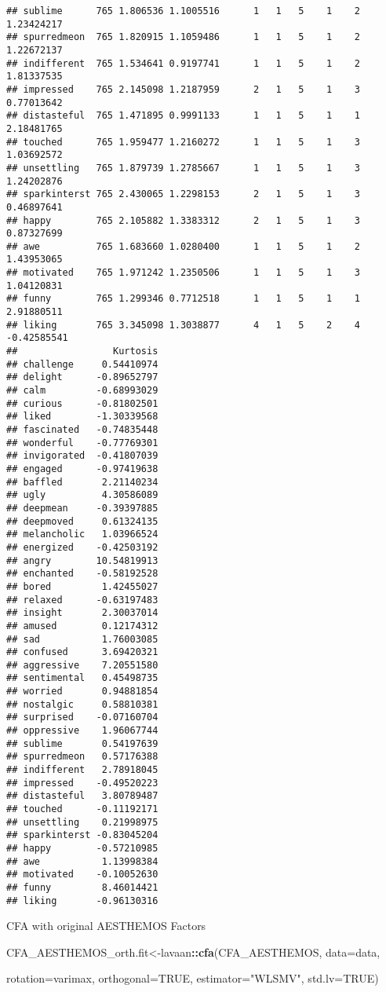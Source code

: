 \documentclass[
]{article}
\newenvironment{Shaded}{\begin{snugshade}}{\end{snugshade}}
\newcommand{\DataTypeTok}[1]{\textcolor[rgb]{0.13,0.29,0.53}{#1}}
\newcommand{\KeywordTok}[1]{\textcolor[rgb]{0.13,0.29,0.53}{\textbf{#1}}}
\newcommand{\NormalTok}[1]{#1}
\newcommand{\OperatorTok}[1]{\textcolor[rgb]{0.81,0.36,0.00}{\textbf{#1}}}
\newcommand{\OtherTok}[1]{\textcolor[rgb]{0.56,0.35,0.01}{#1}}
\newcommand{\StringTok}[1]{\textcolor[rgb]{0.31,0.60,0.02}{#1}}
\begin{document}
\begin{verbatim}
## sublime      765 1.806536 1.1005516      1   1   5    1    2  1.23424217
## spurredmeon  765 1.820915 1.1059486      1   1   5    1    2  1.22672137
## indifferent  765 1.534641 0.9197741      1   1   5    1    2  1.81337535
## impressed    765 2.145098 1.2187959      2   1   5    1    3  0.77013642
## distasteful  765 1.471895 0.9991133      1   1   5    1    1  2.18481765
## touched      765 1.959477 1.2160272      1   1   5    1    3  1.03692572
## unsettling   765 1.879739 1.2785667      1   1   5    1    3  1.24202876
## sparkinterst 765 2.430065 1.2298153      2   1   5    1    3  0.46897641
## happy        765 2.105882 1.3383312      2   1   5    1    3  0.87327699
## awe          765 1.683660 1.0280400      1   1   5    1    2  1.43953065
## motivated    765 1.971242 1.2350506      1   1   5    1    3  1.04120831
## funny        765 1.299346 0.7712518      1   1   5    1    1  2.91880511
## liking       765 3.345098 1.3038877      4   1   5    2    4 -0.42585541
##                 Kurtosis
## challenge     0.54410974
## delight      -0.89652797
## calm         -0.68993029
## curious      -0.81802501
## liked        -1.30339568
## fascinated   -0.74835448
## wonderful    -0.77769301
## invigorated  -0.41807039
## engaged      -0.97419638
## baffled       2.21140234
## ugly          4.30586089
## deepmean     -0.39397885
## deepmoved     0.61324135
## melancholic   1.03966524
## energized    -0.42503192
## angry        10.54819913
## enchanted    -0.58192528
## bored         1.42455027
## relaxed      -0.63197483
## insight       2.30037014
## amused        0.12174312
## sad           1.76003085
## confused      3.69420321
## aggressive    7.20551580
## sentimental   0.45498735
## worried       0.94881854
## nostalgic     0.58810381
## surprised    -0.07160704
## oppressive    1.96067744
## sublime       0.54197639
## spurredmeon   0.57176388
## indifferent   2.78918045
## impressed    -0.49520223
## distasteful   3.80789487
## touched      -0.11192171
## unsettling    0.21998975
## sparkinterst -0.83045204
## happy        -0.57210985
## awe           1.13998384
## motivated    -0.10052630
## funny         8.46014421
## liking       -0.96130316
\end{verbatim}

CFA with original AESTHEMOS Factors

\begin{Shaded}
\begin{Highlighting}[]
\NormalTok{CFA\_AESTHEMOS\_orth.fit\textless{}{-}lavaan}\OperatorTok{::}\KeywordTok{cfa}\NormalTok{(CFA\_AESTHEMOS,}
                         \DataTypeTok{data=}\NormalTok{data,}
                      
                      \DataTypeTok{rotation=}\StringTok{\textquotesingle{}varimax\textquotesingle{}}\NormalTok{,}
                        \DataTypeTok{orthogonal=}\OtherTok{TRUE}\NormalTok{, }
                         \DataTypeTok{estimator=}\StringTok{"WLSMV"}\NormalTok{, }
                         \DataTypeTok{std.lv=}\OtherTok{TRUE}\NormalTok{)}
\end{Highlighting}
\end{Shaded}
\end{document}
